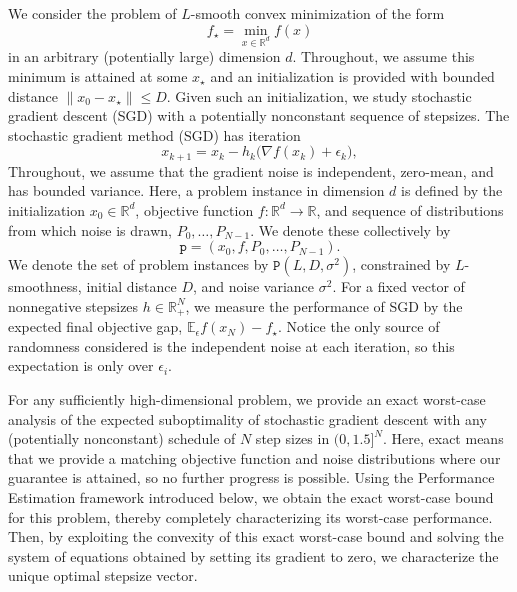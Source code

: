 \documentclass[11pt]{article}
\begin{document}
We consider the problem of $L$-smooth convex minimization of the form
\begin{equation*}
    f_\star = \min_{x\in\mathbb{R}^d} f(x)
\end{equation*}
in an arbitrary (potentially large) dimension $d$. Throughout, we assume this minimum is attained at some $x_\star$ and an initialization is provided with bounded distance
$\|x_0-x_\star\|\leq D$.
Given such an initialization, we study stochastic gradient descent (SGD) with a potentially nonconstant sequence of stepsizes. The stochastic gradient method (SGD) has iteration
\begin{equation*}
    x_{k+1}
    =
    x_k
    -
    h_k\bigl(\nabla f(x_k)+\epsilon_k\bigr),
    \tag{SGD}
\end{equation*}
Throughout, we assume that the gradient noise is independent, zero-mean, and has bounded variance.
Here, a problem instance in dimension $d$ is defined by the initialization
$x_0\in\mathbb{R}^d$, objective function
$f\colon\mathbb{R}^d\rightarrow\mathbb{R}$, and sequence of distributions from which noise is drawn,
$P_0,\dots,P_{N-1}$. We denote these collectively by
\begin{equation*}
    \mathtt{p} = (x_0,f,P_0,\dots,P_{N-1}).
\end{equation*}
We denote the set of problem instances by
$\mathtt{P}(L,D,\sigma^2)$, constrained by $L$-smoothness, initial distance $D$, and noise variance $\sigma^2$.
For a fixed vector of nonnegative stepsizes $h\in\mathbb{R}^N_+$, we measure the performance of SGD by the expected final objective gap,
$\mathbb{E}_{\epsilon} f(x_N)-f_\star$.
Notice the only source of randomness considered is the independent noise at each iteration, so this expectation is only over $\epsilon_i$.


For any sufficiently high-dimensional problem, we provide an exact worst-case analysis of the expected suboptimality of stochastic gradient descent with any (potentially nonconstant) schedule of $N$ step sizes in $(0,1.5]^N$.
Here, exact means that we provide a matching objective function and noise distributions where our guarantee is attained, so no further progress is possible.
Using the Performance Estimation framework introduced below, we obtain the exact worst-case bound for this problem, thereby completely characterizing its worst-case performance.
Then, by exploiting the convexity of this exact worst-case bound and solving the system of equations obtained by setting its gradient to zero, we characterize the unique optimal stepsize vector.
\end{document}
